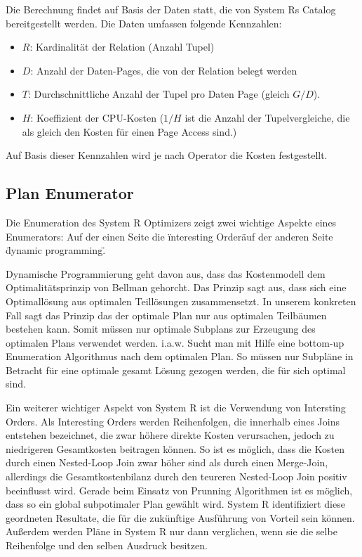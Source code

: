 Die Berechnung findet auf Basis der Daten statt, die von System Rs Catalog bereitgestellt werden. Die Daten umfassen folgende Kennzahlen:

\begin{itemize}
\item $R$: Kardinalität der Relation (Anzahl Tupel)
\item $D$: Anzahl der Daten-Pages, die von der Relation belegt werden
\item $T$: Durchschnittliche Anzahl der Tupel pro Daten Page (gleich $G/D$).
\item $H$: Koeffizient der CPU-Kosten ($1/H$ ist die Anzahl der Tupelvergleiche, die  als gleich den Kosten für einen Page Access sind.)
\end{itemize}

Auf Basis dieser Kennzahlen wird je nach Operator die Kosten festgestellt. 




\subsection{Plan Enumerator}
Die Enumeration des System R Optimizers zeigt zwei wichtige Aspekte eines Enumerators: Auf der einen Seite die \"interesting Order\" auf der anderen Seite \"dynamic programming\". 

Dynamische Programmierung geht davon aus, dass das Kostenmodell dem Optimalitätsprinzip von Bellman \cite{Bellman:1957} gehorcht. Das Prinzip sagt aus, dass sich eine Optimallösung aus optimalen Teillösungen zusammensetzt. In unserem konkreten Fall sagt das Prinzip das der optimale Plan nur aus optimalen Teilbäumen bestehen kann. Somit müssen nur optimale Subplans zur Erzeugung des optimalen Plans verwendet werden. i.a.w. Sucht man mit Hilfe eine bottom-up Enumeration Algorithmus nach dem optimalen Plan. So müssen nur Subpläne in Betracht für eine optimale gesamt Lösung gezogen werden, die für sich optimal sind. 

Ein weiterer wichtiger Aspekt von System R ist die Verwendung von Intersting Orders. Als Interesting Orders werden Reihenfolgen, die innerhalb eines Joins entstehen bezeichnet, die zwar höhere direkte Kosten verursachen, jedoch zu niedrigeren Gesamtkosten beitragen können. So ist es möglich, dass die Kosten durch einen Nested-Loop Join zwar höher sind als durch einen Merge-Join, allerdings die Gesamtkostenbilanz durch den teureren Nested-Loop Join positiv beeinflusst wird. Gerade beim Einsatz von Prunning Algorithmen ist es möglich, dass so ein global subpotimaler Plan gewählt wird. System R identifiziert diese geordneten Resultate, die für die zukünftige Ausführung von Vorteil sein können. Außerdem werden Pläne in System R nur dann verglichen, wenn sie die selbe Reihenfolge und den selben Ausdruck besitzen. 